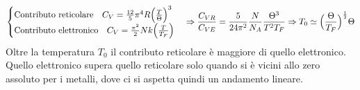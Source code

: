 \begin{equation}
\begin{cases}
	\mbox{Contributo reticolare} \quad C_V = \frac{ 12}{5 } \pi^4 R \Bigl(  \frac{ T}{\Theta }  \Bigr)^3 \\
	\mbox{Contributo elettronico} \quad C_V = \frac{ \pi^2}{2 } N k \Bigl(  \frac{ T}{T_F}  \Bigr) \\
\end{cases}
\Rightarrow \frac{ C_{VR}}{C_{VE} } = \frac{ 5}{24 \pi^2 }\frac{ N}{N_A } \frac{ \Theta^3}{T^2 T_F } \Rightarrow T_0 \simeq \Bigl(  \frac{ \Theta}{T_F }  \Bigr)^{ \frac{ 1}{2 } } \Theta
\end{equation}
Oltre la temperatura $T_0$ il contributo reticolare è maggiore di quello elettronico.
Quello elettronico supera quello reticolare solo quando si è vicini allo zero assoluto per i metalli, dove ci si aspetta quindi un andamento lineare. 


























